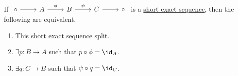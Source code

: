\begin{lemma}\label{lma:splitting-lemma}
	If \(\begin{tikzcd}
		\circ & A & B & C & \circ
		\arrow["\phi ", from=1-2, to=1-3]
		\arrow["\psi", from=1-3, to=1-4]
		\arrow[from=1-1, to=1-2]
		\arrow[from=1-4, to=1-5]
	\end{tikzcd}\) is a \hyperref[def:short-exact-sequence]{short exact sequence}, then the following are equivalent.
	\begin{enumerate}[(1)]
		\item This \hyperref[def:short-exact-sequence]{short exact sequence} \hyperref[def:split-short-exact-sequence]{split}.
		\item \(\exists p\colon B\to A\) such that \(p\circ \phi = \id_{A} \).
		\item \(\exists q\colon C\to B\) such that \(\psi \circ q = \id_{C}\).
	\end{enumerate}
\end{lemma}
